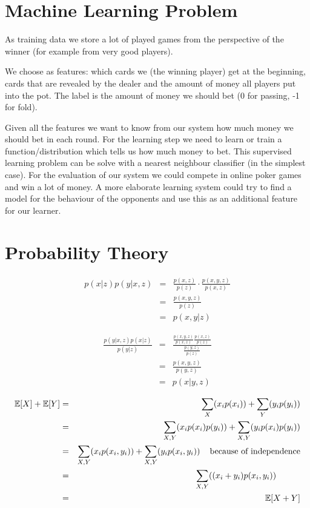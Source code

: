 \section*{Machine Learning Problem}
As training data we store a lot of played games from the perspective of the winner (for example from very good players). 

We choose as features: which cards we (the winning player) get at the beginning, cards that are revealed by the dealer and the amount of money all players put into the pot. The label is the amount of money we should bet (0 for passing, -1 for fold).

Given all the features we want to know from our system how much money we should bet in each round. For the learning step we need to learn or train a function/distribution which tells us how much money to bet. This supervised learning problem can be solve with a nearest neighbour classifier (in the simplest case). For the evaluation of our system we could compete in online poker games and win a lot of money. A more elaborate learning system could try to find a model for the behaviour of the opponents and use this as an additional feature for our learner. 



\section*{Probability Theory}

\begin{eqnarray} 
    p(x|z)p(y|x,z) &=&  \frac{p(x,z)}{p(z)}\cdot \frac{p(x,y,z)}{p(x,z)} \\
    &=&  \frac{p(x,y,z)}{p(z)} \\
    &=&  p(x,y|z) 
\end{eqnarray}

\begin{eqnarray}
    \frac{p(y| x,z)p(x|z)}{p(y|z)}&=& \frac{\frac{p(x,y,z)}{p(x,z)} \frac{p(x,z)}{p(z)}}{\frac{p(y,z)}{p(z)}} \\
    &=& \frac{p(x,y,z)}{p(y,z)} \\
    &=& p(x|y,z) 
\end{eqnarray}


\begin{eqnarray}
    \mathbb{E}[X]+\mathbb{E}[Y]&=& \sum_{X}(x_i p(x_i)) + \sum_{Y}(y_i p(y_i))\\
    &=& \sum_{X, Y}(x_i p(x_i)p(y_i)) + \sum_{X,Y}(y_i p(x_i)p(y_i))\\
    &=& \sum_{X, Y}(x_i p(x_i,y_i)) + \sum_{X,Y}(y_i p(x_i,y_i)) \hspace{4mm}\mbox{because of independence}\\
    &=& \sum_{X, Y}((x_i+y_i) p(x_i,y_i))\hspace{1cm}\\
    &=& \mathbb{E}[X+Y]
\end{eqnarray}

